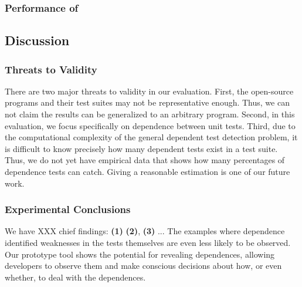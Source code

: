 
\subsubsection{Performance of \ourtool}
\label{sec:performance}






 





\subsection{Discussion}

\subsubsection{Threats to Validity}

There are two major threats to validity in our evaluation.
First, the  open-source
programs and their test suites may not be
representative enough. Thus, we can not claim the results
can be generalized to an arbitrary program.
Second, in this evaluation, we focus specifically on
dependence between unit tests.
Third, due to the computational complexity of the general dependent test
detection problem, it is difficult to know precisely how many dependent
tests exist in a test suite. Thus, we do not
yet have empirical data that shows how many percentages of dependence tests
\ourtool can catch.  Giving a reasonable estimation is one of our future work.

\subsubsection{Experimental Conclusions}


We have XXX chief findings: \textbf{(1)}
\textbf{(2)}, \textbf{(3)} ...
The examples where dependence identified weaknesses in the tests themselves
are even less likely to be observed.  
Our prototype tool shows
the potential for revealing dependences, allowing
developers to observe them and make conscious decisions about how, or even whether,
to deal with the dependences. 
